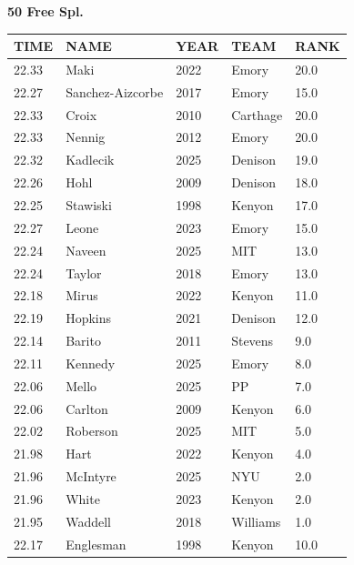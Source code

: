 \begin{table}[H]
\centering
\begin{minipage}[t]{0.6\textwidth}
\centering
\textbf{50 Free Spl.}\\[0.1cm]
\begin{tabular}{@{}p{1.8cm}p{2.8cm}p{1.2cm}p{1.4cm}p{0.8cm}@{}}
\hline
    \textbf{TIME} & \textbf{NAME} & \textbf{YEAR} & \textbf{TEAM} & \textbf{RANK} \\
\hline
    22.33 & Maki & 2022 & Emory & 20.0 \\
    22.27 & Sanchez-Aizcorbe & 2017 & Emory & 15.0 \\
    22.33 & Croix & 2010 & Carthage & 20.0 \\
    22.33 & Nennig & 2012 & Emory & 20.0 \\
    22.32 & Kadlecik & 2025 & Denison & 19.0 \\
    22.26 & Hohl & 2009 & Denison & 18.0 \\
    22.25 & Stawiski & 1998 & Kenyon & 17.0 \\
    22.27 & Leone & 2023 & Emory & 15.0 \\
    22.24 & Naveen & 2025 & MIT & 13.0 \\
    22.24 & Taylor & 2018 & Emory & 13.0 \\
    22.18 & Mirus & 2022 & Kenyon & 11.0 \\
    22.19 & Hopkins & 2021 & Denison & 12.0 \\
    22.14 & Barito & 2011 & Stevens & 9.0 \\
    22.11 & Kennedy & 2025 & Emory & 8.0 \\
    22.06 & Mello & 2025 & PP & 7.0 \\
    22.06 & Carlton & 2009 & Kenyon & 6.0 \\
    22.02 & Roberson & 2025 & MIT & 5.0 \\
    21.98 & Hart & 2022 & Kenyon & 4.0 \\
    21.96 & McIntyre & 2025 & NYU & 2.0 \\
    21.96 & White & 2023 & Kenyon & 2.0 \\
    21.95 & Waddell & 2018 & Williams & 1.0 \\
    22.17 & Englesman & 1998 & Kenyon & 10.0 \\
\hline
\end{tabular}
\end{minipage}
\end{table}

